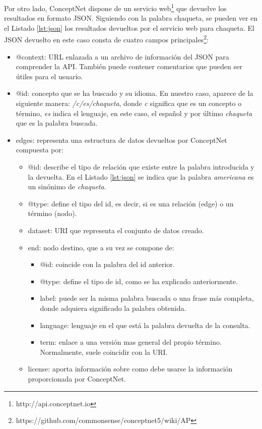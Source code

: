 Por otro lado, ConceptNet dispone de un servicio web\footnote{http://api.conceptnet.io} que devuelve los resultados en formato JSON. Siguiendo con la palabra chaqueta, se pueden ver en el Listado \ref{lst:json} los resultados devueltos por el servicio web para chaqueta. El JSON devuelto en este caso consta de cuatro campos principales\footnote{https://github.com/commonsense/conceptnet5/wiki/AP}:
\begin{itemize}
	\item @context: URL enlazada a un archivo de información del JSON para comprender la API. También puede contener comentarios que pueden ser útiles para el usuario.
	\item @id: concepto que se ha buscado y su idioma. En nuestro caso, aparece de la siguiente manera: \textit{/c/es/chaqueta}, donde  \textit{c} significa que es un concepto o término,  \textit{es} indica el lenguaje, en este caso, el español y por último \textit{chaqueta} que es la palabra buscada.
	\item edges: representa una estructura de datos devueltos por ConceptNet compuesta por:
	\begin{itemize}
		\item @id: describe el tipo de relación que existe entre la palabra introducida y la devuelta. En el Listado \ref{lst:json} se indica que la palabra \textit{americana} es un sinónimo de \textit{chaqueta}.
		\item @type: define el tipo del id, es decir, si es una relación (edge) o un término (nodo).
		\item dataset: URI que representa el conjunto de datos creado.
		\item end: nodo destino, que a su vez se compone de:	
		\begin{itemize}
			\item @id: coincide con la palabra del id anterior.
			\item @type: define el tipo de id, como se ha explicado anteriormente.
			\item label: puede ser la misma palabra buscada o una frase más completa, donde adquiera significado la palabra obtenida.
			\item language: lenguaje en el que está la palabra devuelta de la consulta.
			\item term: enlace a una versión mas general del propio término. Normalmente, suele coincidir con la URI.			
		\end{itemize}
		\item license: aporta información sobre como debe usarse la información proporcionada por ConceptNet.

\end{itemize}
\end{itemize}
